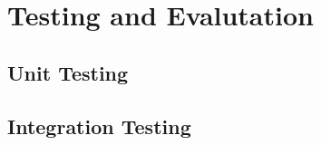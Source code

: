 %
%
\chapter{Testing and Evalutation}%
%
\label{chapter:testing_and_evaluation}

\section{Unit Testing} 

\section{Integration Testing} 